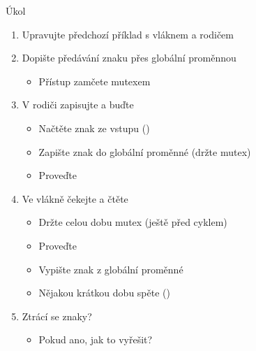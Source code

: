 \begin{frame}{Úkol}

  \begin{enumerate}
    \item Upravujte předchozí příklad s vláknem a rodičem
    \item Dopište předávání znaku přes globální proměnnou
    \begin{itemize}
      \item Přístup zamčete mutexem
    \end{itemize}

    \item V rodiči zapisujte a buďte
    \begin{itemize}
      \item Načtěte znak ze vstupu ()
      \item Zapište znak do globální proměnné (držte mutex)
      \item Proveďte 
    \end{itemize}

    \item Ve vlákně čekejte a čtěte
    \begin{itemize}
      \item Držte celou dobu mutex (ještě před cyklem)
      \item Proveďte 
      \item Vypište znak z globální proměnné
      \item Nějakou krátkou dobu spěte ()
    \end{itemize}

    \item Ztrácí se znaky?
    \begin{itemize}
      \item Pokud ano, jak to vyřešit?
    \end{itemize}
  \end{enumerate}

\end{frame}

